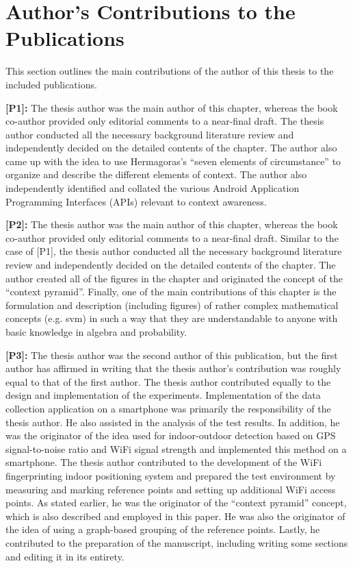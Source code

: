 \section{Author's Contributions to the Publications}
\label{sec:author_contributions}

This section outlines the main contributions of the author of this thesis to the included publications.

\textbf{[P1]:} The thesis author was the main author of this chapter, whereas the book co-author provided only editorial comments to a near-final draft. The thesis author conducted all the necessary background literature review and independently decided on the detailed contents of the chapter. The author also came up with the idea to use Hermagoras's ``seven elements of circumstance'' to organize and describe the different elements of context. The author also independently identified and collated the various Android Application Programming Interfaces (APIs) relevant to context awareness.

\textbf{[P2]:} The thesis author was the main author of this chapter, whereas the book co-author provided only editorial comments to a near-final draft. Similar to the case of [P1], the thesis author conducted all the necessary background literature review and independently decided on the detailed contents of the chapter. The author created all of the figures in the chapter and originated the concept of the ``context pyramid''. Finally, one of the main contributions of this chapter is the formulation and description (including figures) of rather complex mathematical concepts (e.g. \acrlong{svm}) in such a way that they are understandable to anyone with basic knowledge in algebra and probability.

\textbf{[P3]:} The thesis author was the second author of this publication, but the first author has affirmed in writing that the thesis author's contribution was roughly equal to that of the first author. The thesis author contributed equally to the design and implementation of the experiments. Implementation of the data collection application on a smartphone was primarily the responsibility of the thesis author. He also assisted in the analysis of the test results. In addition, he was the originator of the idea used for indoor-outdoor detection based on GPS signal-to-noise ratio and WiFi signal strength and implemented this method on a smartphone. The thesis author contributed to the development of the WiFi fingerprinting indoor positioning system and prepared the test environment by measuring and marking reference points and setting up additional WiFi access points. As stated earlier, he was the originator of the ``context pyramid'' concept, which is also described and employed in this paper. He was also the originator of the idea of using a graph-based grouping of the reference points. Lastly, he contributed to the preparation of the manuscript, including writing some sections and editing it in its entirety.

